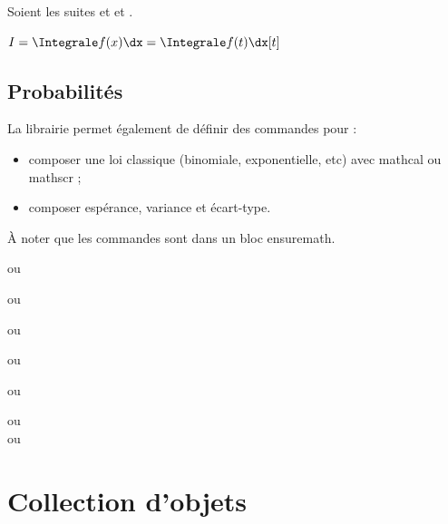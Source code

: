 \documentclass[a4paper,french,11pt]{article}
\newcommand\clib[1]{%
	{\tcbox[vignettelib]{#1}\xspace}%
}
\begin{document}
\begin{PresCodeTexPL}{}
Soient les suites  et  et \Suite[q]{\Omega}.
\end{PresCodeTexPL}

\begin{PresCodeTexPL}{}
$I = \Integrale f(x) \dx = \Integrale f(t) \dx[t]$
\end{PresCodeTexPL}

\subsection{Probabilités}

\begin{tipblock}
La librairie \clib{ecritures} permet également de définir des commandes pour :

\begin{itemize}
	\item composer une loi classique (binomiale, exponentielle, etc) avec \textsf{mathcal} ou \textsf{mathscr} ;
	\item composer espérance, variance et écart-type.
\end{itemize}

À noter que les commandes sont dans un bloc \textsf{ensuremath}.
\end{tipblock}

\begin{PresCodeTexPL}{}

 ou 

 ou 

 ou 

 ou 

 ou 
\end{PresCodeTexPL}

\begin{PresCodeTexPL}{}
{} ou  \\
 ou  \\
\end{PresCodeTexPL}

\pagebreak

\section{Collection d'objets}\label{ensembles}
\end{document}
